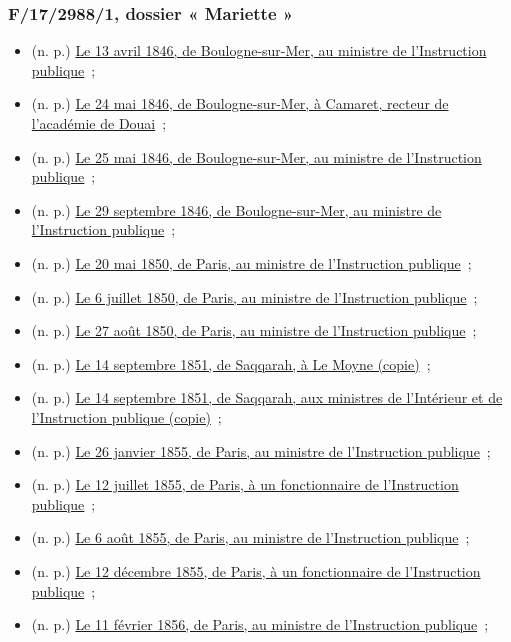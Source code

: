 \documentclass{book}
\begin{document}
\subsubsection*{F/17/2988/1, dossier « Mariette »}
\begin{itemize}
\item (n. p.) \hyperlink{CoEg_Mariette_1846-04-13}{Le 13 avril 1846, de Boulogne-sur-Mer, au ministre de l’Instruction publique}~;
\item (n. p.) \hyperlink{CoEg_Mariette_1846-05-24}{Le 24 mai 1846, de Boulogne-sur-Mer, à Camaret, recteur de l’académie de Douai}~;
\item (n. p.) \hyperlink{CoEg_Mariette_1846-05-25}{Le 25 mai 1846, de Boulogne-sur-Mer, au ministre de l’Instruction publique}~;
\item (n. p.) \hyperlink{CoEg_Mariette_1846-09-29}{Le 29 septembre 1846, de Boulogne-sur-Mer, au ministre de l’Instruction publique}~;
\item (n. p.) \hyperlink{CoEg_Mariette_1850-05-20}{Le 20 mai 1850, de Paris, au ministre de l’Instruction publique}~;
\item (n. p.) \hyperlink{CoEg_Mariette_1850-07-06}{Le 6 juillet 1850, de Paris, au ministre de l’Instruction publique}~;
\item (n. p.) \hyperlink{CoEg_Mariette_1850-08-27}{Le 27 août 1850, de Paris, au ministre de l’Instruction publique}~;
\item (n. p.) \hyperlink{CoEg_Mariette_1851-10-14a}{Le 14 septembre 1851, de Saqqarah, à Le Moyne (copie)}~;
\item (n. p.) \hyperlink{CoEg_Mariette_1851-10-14b}{Le 14 septembre 1851, de Saqqarah, aux ministres de l'Intérieur et de l'Instruction publique (copie)}~;
\item (n. p.) \hyperlink{CoEg_Mariette_1855-01-26}{Le 26 janvier 1855, de Paris, au ministre de l’Instruction publique}~;
\item (n. p.) \hyperlink{CoEg_Mariette_1855-07-12}{Le 12 juillet 1855, de Paris, à un fonctionnaire de l’Instruction publique}~;
\item (n. p.) \hyperlink{CoEg_Mariette_1855-08-06}{Le 6 août 1855, de Paris, au ministre de l’Instruction publique}~;
\item (n. p.) \hyperlink{CoEg_Mariette_1855-12-12}{Le 12 décembre 1855, de Paris, à un fonctionnaire de l’Instruction publique}~;
\item (n. p.) \hyperlink{CoEg_Mariette_1856-02-11}{Le 11 février 1856, de Paris, au ministre de l’Instruction publique}~;

\end{itemize}
\end{document}
